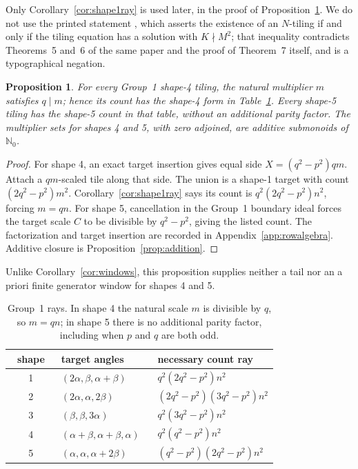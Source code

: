 \documentclass[11pt]{amsart}
\newtheorem{proposition}[theorem]{Proposition}
\theoremstyle{definition}
\theoremstyle{remark}
\newcommand{\Nzero}{\mathbb N_0}
\begin{document}
\noindent Only Corollary~\ref{cor:shape1ray} is used later, in the proof of
Proposition~\ref{prop:group1}.  We do not use the printed statement
\cite[Thm.~7]{Beeson2229}, which asserts the existence of an $N$-tiling if
and only if the tiling equation has a solution with $K\nmid M^2$; that
inequality contradicts Theorems~5 and~6 of the same paper and the proof of
Theorem~7 itself, and is a typographical negation.

\begin{proposition}\label{prop:group1}
For every Group~1 shape-4 tiling, the natural multiplier $m$ satisfies
$q\mid m$; hence its count has the shape-4 form in
Table~\ref{tab:group1}.  Every shape-5 tiling has the shape-5 count in that
table, without an additional parity factor.  The multiplier sets for shapes
4 and 5, with zero adjoined, are additive submonoids of $\Nzero$.
\end{proposition}

\begin{proof}
For shape 4, an exact target insertion gives equal side
$X=(q^2-p^2)qm$.  Attach a $qm$-scaled tile along that side.  The union is a
shape-1 target with count $(2q^2-p^2)m^2$.  Corollary~\ref{cor:shape1ray}
says its count is
$q^2(2q^2-p^2)n^2$, forcing $m=qn$.
For shape 5, cancellation in the Group~1 boundary ideal forces the target
scale $C$ to be divisible by $q^2-p^2$, giving the listed count.  The
factorization and target insertion are recorded in
Appendix~\ref{app:rowalgebra}.  Additive closure is
Proposition~\ref{prop:addition}.
\end{proof}

Unlike Corollary~\ref{cor:windows}, this proposition supplies neither a tail
nor an a priori finite generator window for shapes 4 and 5.

\begin{table}[ht]
\centering
\small
\renewcommand{\arraystretch}{1.12}
\begin{tabular}{@{}c>{\raggedright\arraybackslash}p{0.36\linewidth}
>{\raggedright\arraybackslash}p{0.45\linewidth}@{}}
\toprule
shape & target angles & necessary count ray \\
\midrule
1 & $(2\alpha,\beta,\alpha+\beta)$
  & $q^2(2q^2-p^2)n^2$ \\
2 & $(2\alpha,\alpha,2\beta)$
  & $(2q^2-p^2)(3q^2-p^2)n^2$ \\
3 & $(\beta,\beta,3\alpha)$
  & $q^2(3q^2-p^2)n^2$ \\
4 & $(\alpha+\beta,\alpha+\beta,\alpha)$
  & $q^2(q^2-p^2)n^2$ \\
5 & $(\alpha,\alpha,\alpha+2\beta)$
  & $(q^2-p^2)(2q^2-p^2)n^2$ \\
\bottomrule
\end{tabular}
\caption{Group~1 rays.  In shape 4 the natural scale $m$ is divisible by
$q$, so $m=qn$; in shape 5 there is no additional parity factor, including
when $p$ and $q$ are both odd.}\label{tab:group1}
\end{table}
\end{document}
